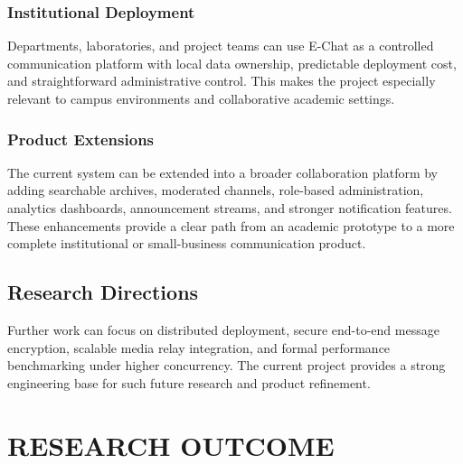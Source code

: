 \documentclass[12pt,a4paper,oneside]{report}
\begin{document}
\subsection{Institutional Deployment}
\label{subsec:institutional-deployment}
Departments, laboratories, and project teams can use E-Chat as a controlled
communication platform with local data ownership, predictable deployment cost,
and straightforward administrative control. This makes the project especially
relevant to campus environments and collaborative academic settings.

\subsection{Product Extensions}
\label{subsec:product-extensions}
The current system can be extended into a broader collaboration platform by
adding searchable archives, moderated channels, role-based administration,
analytics dashboards, announcement streams, and stronger notification features.
These enhancements provide a clear path from an academic prototype to a more
complete institutional or small-business communication product.

\section{Research Directions}
\label{sec:research-directions}

Further work can focus on distributed deployment, secure end-to-end message
encryption, scalable media relay integration, and formal performance benchmarking
under higher concurrency. The current project provides a strong engineering base
for such future research and product refinement.

\cleardoublepage


\chapter*{RESEARCH OUTCOME}
{}
\label{front:research-outcome}
\thispagestyle{plain}
\end{document}
